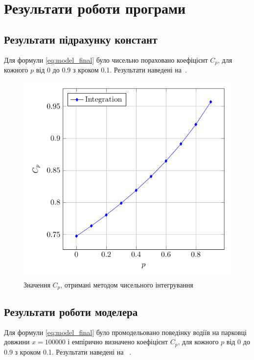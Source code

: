 \section{Результати роботи програми}
\label{sec:result_analyse}
\jointitles
\subsection{Результати підрахунку констант}
Для формули \eqref{eq:model_final} було чисельно пораховано коефіцієнт $C_{p}$, для кожного $p$ від 0 до 0.9 з кроком 0.1. Результати наведені на~.

\begin{figure}[H]
    \centering
    \includegraphics[scale=0.8]{chapter_Practice/img/integ_cp}
    \caption{Значення $C_{p}$, отримані методом чисельного інтегрування}
    \label{fig:integ_cp}
\end{figure}

\subsection{Результати роботи моделера}

Для формули \eqref{eq:model_final} було промодельовано поведінку водіїв на парковці довжини $x=100000$ і емпірично визначено коефіцієнт $C_{p}$, для кожного $p$ від 0 до 0.9 з кроком 0.1. Результати наведені на ~.


